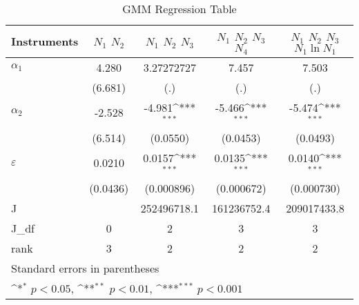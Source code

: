 \begin{table}[htbp]\centering
\newcommand{\sym}[1]{\ifmmode^{#1}\else\(^{#1}\)\fi}
\caption{GMM Regression Table}
\begin{tabular}{l*{4}{c}}
\hline\hline
Instruments           &\multicolumn{1}{c}{$N_1$ $N_2$}&\multicolumn{1}{c}{$N_1$ $N_2$ $N_3$}&\multicolumn{1}{c}{$N_1$ $N_2$ $N_3$ $N_4$}&\multicolumn{1}{c}{$N_1$ $N_2$ $N_3$ $N_1\ln N_1$}\\
\hline
$\alpha_1$           &       4.280         &        3.27272727         &       7.457         &       7.503         \\
                    &     (6.681)         &         (.)         &         (.)         &         (.)         \\
\hline
$\alpha_2$           &      -2.528         &      -4.981\sym{***}&      -5.466\sym{***}&      -5.474\sym{***}\\
                    &     (6.514)         &    (0.0550)         &    (0.0453)         &    (0.0493)         \\
\hline
$\varepsilon$       &      0.0210         &      0.0157\sym{***}&      0.0135\sym{***}&      0.0140\sym{***}\\
                    &    (0.0436)         &  (0.000896)         &  (0.000672)         &  (0.000730)         \\
\hline
J                   &                     & 252496718.1         & 161236752.4         & 209017433.8         \\
J\_df                &           0         &           2         &           3         &           3         \\
rank                &           3         &           2         &           2         &           2         \\
\hline\hline
\multicolumn{5}{l}{\footnotesize Standard errors in parentheses}\\
\multicolumn{5}{l}{\footnotesize \sym{*} \(p<0.05\), \sym{**} \(p<0.01\), \sym{***} \(p<0.001\)}\\
\end{tabular}\label{tab:gmm_table}
\end{table}
